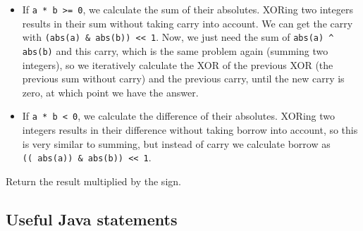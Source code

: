 \documentclass[table, xcdraw]{article}%
\begin{document}
\begin{itemize}
    \item If \texttt{a * b >= 0}, we calculate the sum of their absolutes. XORing two integers results in their sum without taking carry into account. We can get the carry with \texttt{(abs(a) & abs(b)) << 1}. Now, we just need the sum of \texttt{abs(a) ^ abs(b)} and this carry, which is the same problem again (summing two integers), so we iteratively calculate the XOR of the previous XOR (the previous sum without carry) and the previous carry, until the new carry is zero, at which point we have the answer.
    \item If \texttt{a * b < 0}, we calculate the difference of their absolutes. XORing two integers results in their difference without taking borrow into account, so this is very similar to summing, but instead of carry we calculate borrow as \texttt{((~abs(a)) & abs(b)) << 1}.
\end{itemize}

Return the result multiplied by the sign.

\subsection{Useful Java statements}
\end{document}
